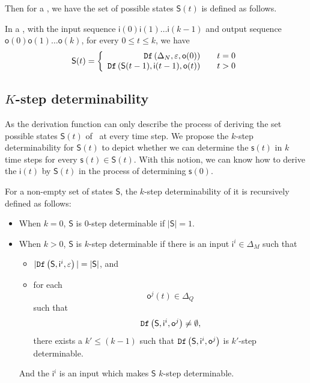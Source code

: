  Then for a \BCN, we have the set of possible states $\mathsf{S}(t)$ is defined as follows.
 \begin{definition}[$\mathsf{S}(t)$] In a \BCN, with the input sequence $\mathsf{i}(0)\mathsf{i}(1)\ldots\mathsf{i}(k-1)$ and output sequence $\mathsf{o}(0)\mathsf{o}(1)\ldots\mathsf{o}(k)$, for every $0\le t\le k$, we have
	\[\mathsf{S}(t)=\left\{
\begin{array}{rcl}
{\tt Df}\left(\Delta_N,\varepsilon,\mathsf{o}(0)\right)      &      & {t=0}\\
{\tt Df}\left(\mathsf{S}(t-1),\mathsf{i}(t-1),\mathsf{o}(t)\right)       &      & {t>0}
\end{array} \right. \]

\end{definition}
 
 
\subsection{$K$-step determinability}
As the derivation function can only describe the process of deriving the set possible states $\mathsf{S}(t)$ of \BCNs\ at every time step.  We propose the $k$-step determinability for $\mathsf{S}(t)$ to depict whether we can determine the $\mathsf{s}(t)$ in $k$ time steps for every $\mathsf{s}(t)\in \mathsf{S}(t)$. With this notion, we can know how to derive the $\mathsf{i}(t)$ by $\mathsf{S}(t)$ in the process of determining $\mathsf{s}(0)$. 
\begin{definition} 
For a non-empty  set of states $\mathsf{S}$, the $k$-step determinability of it is recursively defined as follows:
 \begin{itemize}
 \item When $k=0$, $\mathsf{S}$ is $0$-step determinable if $|\mathsf{S}|=1$. 
 \item When $k>0$, $\mathsf{S}$ is $k$-step determinable
 if there is an input $\mathsf{i}^{i} \in \Delta_M$ such that
 \begin{itemize}
 \item  $|{\tt Df}\left(\mathsf{S},\mathsf{i}^{i},\varepsilon\right)|=|\mathsf{S}|$, and 
 \item  for each \[\mathsf{o}^{j}(t)\in \Delta_Q\] such that \[{\tt Df}\left(\mathsf{S},\mathsf{i}^{i},\mathsf{o}^{j}\right)\neq \emptyset,\] there exists a ${k'}\le 
(k-1)$ such that ${\tt Df}\left(\mathsf{S},\mathsf{i}^{i},\mathsf{o}^{j}\right)$ is $k'$-step determinable.
 \end{itemize}
 And the $\mathsf{i}^{i}$ is an input which makes $\mathsf{S}$ $k$-step determinable.
 \end{itemize}
\end{definition}

